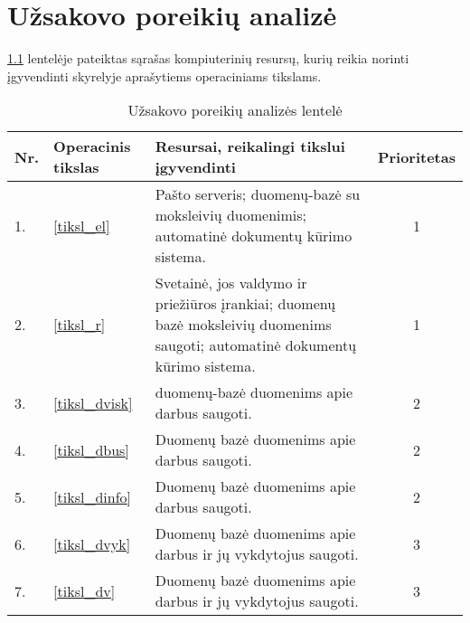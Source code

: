 \chapter{Užsakovo poreikių analizė}

\ref{tab:poreikiai} lentelėje pateiktas sąrašas kompiuterinių resursų, 
kurių reikia norinti įgyvendinti \emph{}
skyrelyje aprašytiems operaciniams tikslams.

\begin{table}
  \centering
  \begin{tabular}[]{| l | p{1.6cm} | p{5.8cm} | c |}
    \hline
    Nr. & Operacinis tikslas & Resursai, reikalingi tikslui įgyvendinti &
    Prioritetas \\
    \hline
    1. & \ref{tiksl_el} & 
      Pašto serveris; \gls{duomenų-bazė} su moksleivių duomenimis; 
      automatinė dokumentų kūrimo sistema. & 1 \\
    \hline
    2. & \ref{tiksl_r} & 
      Svetainė, jos valdymo ir priežiūros įrankiai; duomenų bazė moksleivių
      duomenims saugoti; automatinė dokumentų kūrimo sistema. & 1 \\
    \hline
    3. & \ref{tiksl_dvisk} &
      \Gls{duomenų-bazė} duomenims apie darbus saugoti. & 2 \\
    \hline
    4. & \ref{tiksl_dbus} &
      Duomenų bazė duomenims apie darbus saugoti. & 2 \\
    \hline
    5. & \ref{tiksl_dinfo} &
      Duomenų bazė duomenims apie darbus saugoti. & 2 \\
    \hline
    6. & \ref{tiksl_dvyk} &
      Duomenų bazė duomenims apie darbus ir jų vykdytojus saugoti. & 3 \\
    \hline
    7. & \ref{tiksl_dv} &
      Duomenų bazė duomenims apie darbus ir jų vykdytojus saugoti. & 3 \\
    \hline
  \end{tabular}
  \caption{Užsakovo poreikių analizės lentelė}
  \label{tab:poreikiai}
\end{table}
